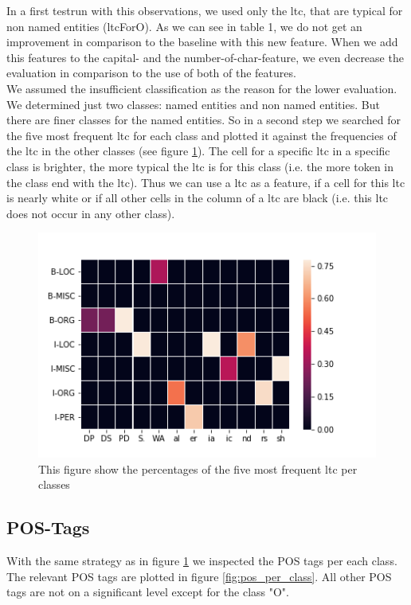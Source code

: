 \documentclass[noindent, nochapname]{tudexercise}
\begin{document}
			In a first testrun with this observations, we used only the ltc, that are typical for non named entities (ltcForO). As we can see in table 1, we do not get an improvement in comparison to the baseline with this new feature. When we add this features to the capital- and the number-of-char-feature, we even decrease the evaluation in comparison to the use of both of the features.\\
			
			We assumed the insufficient classification as the reason for the lower evaluation. We determined just two classes: named entities and non named entities. But there are finer classes for the named entities. So in a second step we searched for the five most frequent ltc for each class and plotted it against the frequencies of the ltc in the other classes (see figure \ref{fig:ltc_for_all_classes}). The cell for a specific ltc in a specific class is brighter, the more typical the ltc is for this class (i.e. the more token in the class end with the ltc). Thus we can use a ltc as a feature, if a cell for this ltc is nearly white or if all other cells in the column of a ltc are black (i.e. this ltc does not occur in any other class).
			
			\begin{figure}[h]
				\centering
				\includegraphics[scale=0.6]{img/ltc_all_classes.png}
				\caption{This figure show the percentages of the five most frequent ltc per classes}
				\label{fig:ltc_for_all_classes}
			\end{figure}
		
		\subsection{POS-Tags}
			With the same strategy as in figure \ref{fig:ltc_for_all_classes} we inspected the POS tags per each class. The relevant POS tags are plotted in figure \ref{fig:pos_per_class}. All other POS tags are not on a significant level except for the class "O".
			
\end{document}
